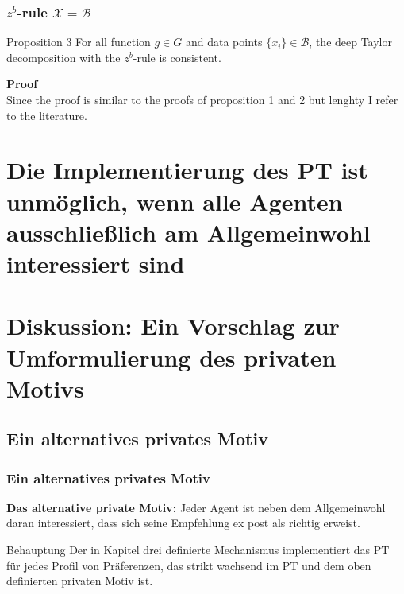 \documentclass{beamer}
\begin{document}
\begin{frame}
\frametitle{$z^b$-rule $\mathcal{X}=\mathcal{B}$}
\vspace{-0.4cm}
\begin{block}{Proposition 3}
For all function $g \in G$ and data points $\{x_i\} \in \mathcal{B}$, the deep Taylor decomposition with the $z^b$-rule is consistent.
\end{block}
\vspace{0.5cm}
\textbf{Proof}\\
Since the proof is similar to the proofs of proposition 1 and 2 but lenghty I refer to the literature.

\end{frame}


\section[ausschlie{\ss}lich Allgemeinwohl]{Die Implementierung des PT ist unm\"oglich, wenn alle Agenten ausschlie{\ss}lich am Allgemeinwohl interessiert sind} 












\section[alternatives privates Motiv]{Diskussion: Ein Vorschlag zur Umformulierung des privaten Motivs}

\subsection{Ein alternatives privates Motiv}
\begin{frame}\frametitle{Ein alternatives privates Motiv}
\vspace{-1.2cm}
\textbf{Das alternative private Motiv:} Jeder Agent ist neben dem Allgemeinwohl daran interessiert, dass sich seine Empfehlung ex post als richtig erweist.
\vspace{0.4cm}
\begin{block}{Behauptung}
Der in Kapitel drei definierte Mechanismus implementiert das PT f\"ur jedes Profil von Pr\"aferenzen, das strikt wachsend im PT und dem oben definierten privaten Motiv ist.
\end{block}


\end{frame}
\end{document}
